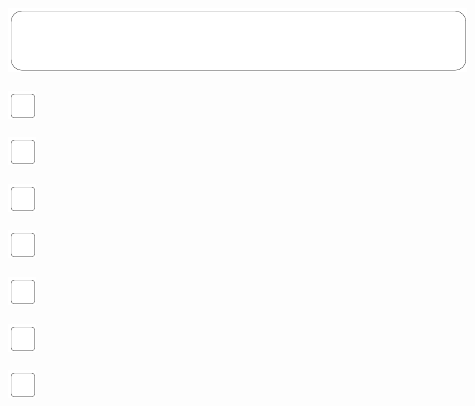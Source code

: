 \documentclass[11pt,titlepage]{article}
\begin{document}
\vspace{6mm}

\noindent
\includegraphics[]{mediumbox.pdf}

\vspace{15mm}

\noindent
\includegraphics[]{checkbox-4mm.pdf}

\vspace{10mm}

\noindent
\includegraphics[]{checkbox-4mm.pdf}

\vspace{10mm}

\noindent
\includegraphics[]{checkbox-4mm.pdf}

\vspace{10mm}

\noindent
\includegraphics[]{checkbox-4mm.pdf}

\vspace{10mm}

\noindent
\includegraphics[]{checkbox-4mm.pdf}

\vspace{10mm}

\noindent
\includegraphics[]{checkbox-4mm.pdf}

\vspace{10mm}

\noindent
\includegraphics[]{checkbox-4mm.pdf}
\end{document}
